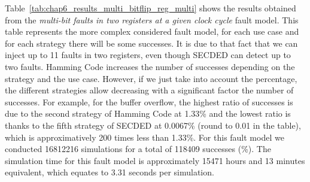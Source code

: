 Table~\ref{tab:chap6_results_multi_bitflip_reg_multi} shows the results obtained from the \textit{multi-bit faults in two registers at a given clock cycle} fault model. This table represents the more complex considered fault model, for each use case and for each strategy there will be some successes. It is due to that fact that we can inject up to 11 faults in two registers, even though SECDED can detect up to two faults. Hamming Code increases the number of successes depending on the strategy and the use case. However, if we just take into account the percentage, the different strategies allow decreasing with a significant factor the number of successes. For example, for the buffer overflow, the highest ratio of successes is due to the second strategy of Hamming Code at 1.33\% and the lowest ratio is thanks to the fifth strategy of SECDED at 0.0067\% (round to 0.01 in the table), which is approximatively 200 times less than 1.33\%. For this fault model we conducted \num{16812216} simulations for a total of \num{118409} successes (\%). The simulation time for this fault model is approximately \num{15471} hours and 13 minutes equivalent, which equates to 3.31 seconds per simulation.


